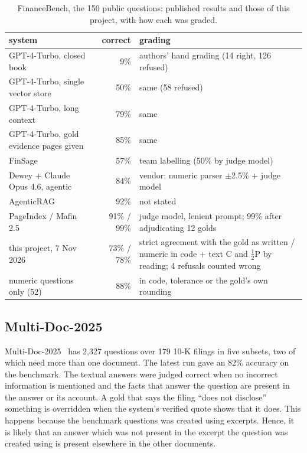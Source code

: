 \begin{table}[h]
\centering\footnotesize
\caption{FinanceBench, the 150 public questions: published results and those of this project, with how each was graded.}
\label{tab:published}
\begin{tabular}{@{}>{\raggedright\arraybackslash}p{62mm}r>{\raggedright\arraybackslash}p{70mm}@{}}
\toprule
system & correct & grading \\
\midrule
GPT-4-Turbo, closed book~\citep{islam2023financebench} & 9\% & authors' hand grading (14 right, 126 refused) \\
GPT-4-Turbo, single vector store~\citep{islam2023financebench} & 50\% & same (58 refused) \\
GPT-4-Turbo, long context~\citep{islam2023financebench} & 79\% & same \\
GPT-4-Turbo, gold evidence pages given~\citep{islam2023financebench} & 85\% & same \\
FinSage~\citep{wang2025finsage} & 57\% & team labelling (50\% by judge model) \\
Dewey + Claude Opus 4.6, agentic~\citep{dewey2026financebench} & 84\% & vendor: numeric parser $\pm$2.5\% + judge model \\
AgenticRAG~\citep{suresh2026agenticrag} & 92\% & not stated \\
PageIndex / Mafin 2.5~\citep{vectify2026mafin} & 91\% / 99\% & judge model, lenient prompt; 99\% after adjudicating 12 golds \\
\midrule
this project, 7 Nov 2026 & 73\% / 78\% & strict agreement with the gold as written / numeric in code + text C and $\tfrac12$P by reading; 4 refusals counted wrong \\
\quad numeric questions only (52) & 88\% & in code, tolerance or the gold's own rounding \\
\bottomrule
\end{tabular}
\end{table}

\subsection{Multi-Doc-2025}

Multi-Doc-2025~\citep{chen2026hcrag} has 2,327 questions over 179 10-K filings in five subsets, two of which need more than one document. The latest run gave an 82\% accuracy on the benchmark. The textual answers were judged correct when no incorrect information is mentioned  and the facts that answer the question are present in the answer or its account. A gold that says the filing ``does not disclose'' something is overridden when the system's verified quote shows that it does. This happens because the benchmark questions was created using excerpts. Hence, it is likely that an answer which was not present in the excerpt the question was created using is present elsewhere in the other documents.
